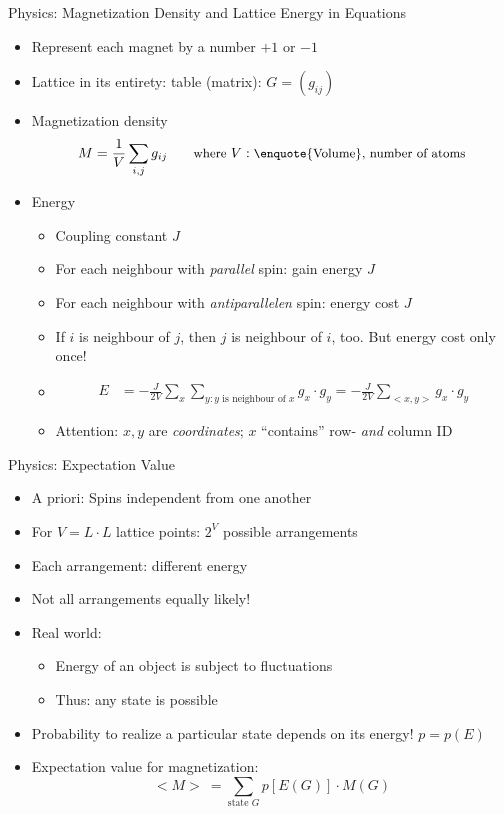 \begin{frame}{Physics: Magnetization Density and Lattice Energy in Equations}
%
\begin{itemize}
\item Represent each magnet by a number $+1$ or $-1$
\item Lattice in its entirety: table (matrix): $G = \left( g_{ij} \right)$
\item Magnetization density
	\[ \small M = \frac{1}{V} \sum_{i, j} g_{ij} \qquad \text{where } V: \text{\enquote{Volume}, number of atoms} \]
	\vspace{-12pt}
\item Energy
	\begin{itemize}
	\item Coupling constant $J$
	\item For each neighbour with \emph{parallel} spin: gain energy $J$
	\item For each neighbour with \emph{antiparallelen} spin: energy cost $J$
	\item If $i$ is neighbour of $j$, then $j$ is neighbour of $i$, too. But energy cost only once!
	\item 
		\begin{align*}
			E &= -\frac{J}{2V} \sum_x \sum_{y: y \text{ is neighbour of }x} g_x \cdot g_y 
			  = -\frac{J}{2V} \sum_{<x, y>} g_x \cdot g_y
		\end{align*}			
	\item Attention: $x, y$ are \emph{coordinates}; $x$ \enquote{contains} row- \emph{and} column ID
	\end{itemize}
\end{itemize}
%
\end{frame}


\begin{frame}{Physics: Expectation Value}
%
\begin{itemize}
\item A priori: Spins independent from one another
\item For $V = L \cdot L$ lattice points: $2^V$ possible arrangements
\item Each arrangement: different energy
\item Not all arrangements equally likely!
\item Real world:
	\begin{itemize}
	\item Energy of an object is subject to fluctuations
	\item Thus: any state is possible
	\end{itemize}
\item Probability to realize a particular state depends on its energy! $p = p(E)$
\item Expectation value for magnetization:
	\[ <M> ~ = \sum_{\text{state } G} p[E(G)] \cdot M(G) \]
\end{itemize}
%
\end{frame}

